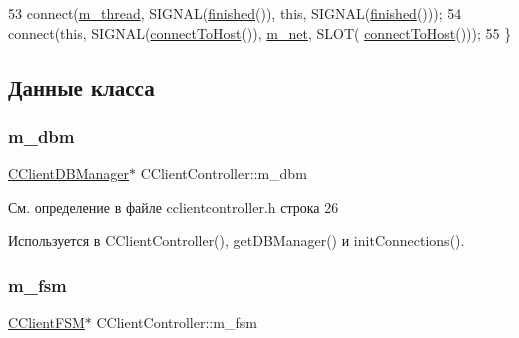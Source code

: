 \begin{DoxyCode}
53     connect(\hyperlink{class_c_client_controller_ab573eef5149837a53b276c928d2b680d}{m\_thread}, SIGNAL(\hyperlink{class_c_client_controller_a04a024fdb1135b1b5dec86b006511672}{finished}()), \textcolor{keyword}{this}, SIGNAL(\hyperlink{class_c_client_controller_a04a024fdb1135b1b5dec86b006511672}{finished}()));
54     connect(\textcolor{keyword}{this}, SIGNAL(\hyperlink{class_c_client_controller_a358ef743560d560acef69e90dfaca11e}{connectToHost}()), \hyperlink{class_c_client_controller_ae97793346f702b77829129673408df48}{m\_net}, SLOT(
      \hyperlink{class_c_client_controller_a358ef743560d560acef69e90dfaca11e}{connectToHost}()));
55 \}
\end{DoxyCode}


\subsection{Данные класса}
\hypertarget{class_c_client_controller_aacc71f5de726af350427a5eaedd6cf6c}{}\label{class_c_client_controller_aacc71f5de726af350427a5eaedd6cf6c} 
\subsubsection{\texorpdfstring{m\+\_\+dbm}{m\_dbm}}
{\footnotesize\ttfamily \hyperlink{class_c_client_d_b_manager}{C\+Client\+D\+B\+Manager}$\ast$ C\+Client\+Controller\+::m\+\_\+dbm\hspace{0.3cm}{\ttfamily [private]}}



См. определение в файле cclientcontroller.\+h строка 26



Используется в C\+Client\+Controller(), get\+D\+B\+Manager() и init\+Connections().

\hypertarget{class_c_client_controller_ade8b08c2eae487031b6b64dac3296f5d}{}\label{class_c_client_controller_ade8b08c2eae487031b6b64dac3296f5d} 
\subsubsection{\texorpdfstring{m\+\_\+fsm}{m\_fsm}}
{\footnotesize\ttfamily \hyperlink{class_c_client_f_s_m}{C\+Client\+F\+SM}$\ast$ C\+Client\+Controller\+::m\+\_\+fsm\hspace{0.3cm}{\ttfamily [private]}}



